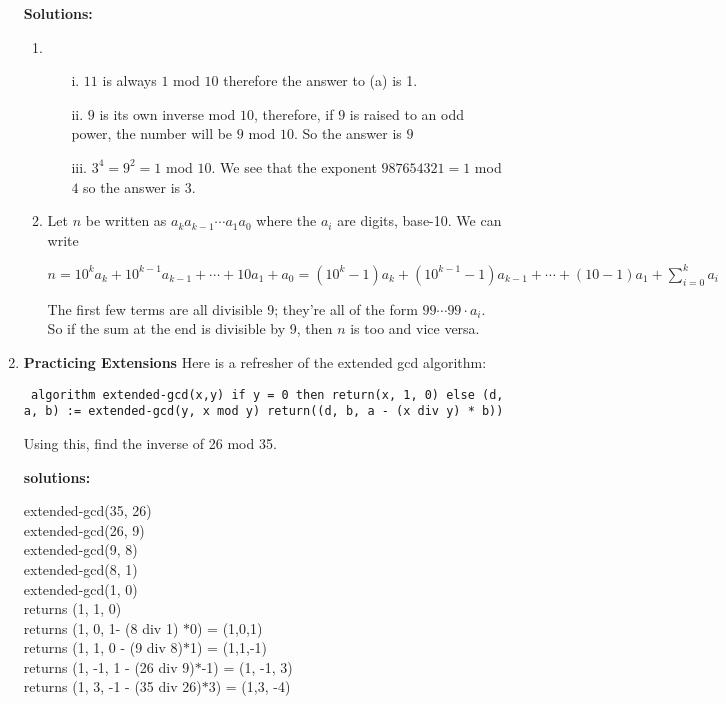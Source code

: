 \documentclass[11pt]{article}
\newif\ifsolutions
\begin{document}
\begin{enumerate}
\textbf{Solutions:}
\begin{enumerate}
\item
\begin{enumerate}
\item[i.] \quad $11$ is always $1$ mod $10$ therefore the answer to (a) is 1.
\item[ii.] \quad $9$ is its own inverse mod $10$, therefore, if $9$ is raised to an odd power, the number will be $9$ mod $10$. So the answer is $9$
\item[iii.] \quad $3^4 = 9^2 = 1 $ mod $ 10$. We see that the exponent $987654321 = 1$ mod $4$ so the answer is $3$.
\end{enumerate}
\item  Let $n$ be written as $a_k a_{k-1}\cdots a_1 a_0$ where the $a_i$ are digits, base-10.
       We can write 

       $n = 10^k a_k + 10^{k-1}a_{k-1} + \cdots + 10a_1 + a_0 = (10^k-1) a_k + (10^{k-1}-1)a_{k-1} + \cdots + (10-1)a_1 + \sum_{i=0}^k a_i$

       The first few terms are all divisible 9; they're all of the form $99\cdots 99 \cdot a_i$.
       So if the sum at the end is divisible by 9, then $n$ is too and vice versa. 
\end{enumerate}
\fi

\vspace{35mm}

\item {\bf Practicing Extensions} Here is a refresher of the extended gcd algorithm:

{\obeylines \tt
algorithm extended-gcd(x,y)
\quad if y = 0 then return(x, 1, 0)
\quad else
\quad\quad (d, a, b) := extended-gcd(y, x mod y)
\quad\quad return((d, b, a - (x div y) * b))}

Using this, find the inverse of 26 mod 35.

\ifsolutions
\newpage
 {\bf solutions:} 

extended-gcd(35, 26) \\
\tab extended-gcd(26, 9) \\
\tab \tab extended-gcd(9, 8) \\
\tab \tab \tab extended-gcd(8, 1) \\
\tab \tab \tab \tab extended-gcd(1, 0) \\
\tab \tab\tab \tab returns (1, 1, 0) \\
\tab \tab \tab returns (1, 0, 1- (8 div 1) $*$0) = (1,0,1)  \\
\tab \tab returns (1, 1, 0 - (9 div 8)$*$1) = (1,1,-1) \\
\tab returns (1, -1, 1 - (26 div 9)$*$-1) = (1, -1, 3) \\
returns (1, 3, -1 - (35 div 26)$*$3) = (1,3, -4) \\


\end{enumerate}
\end{document}
